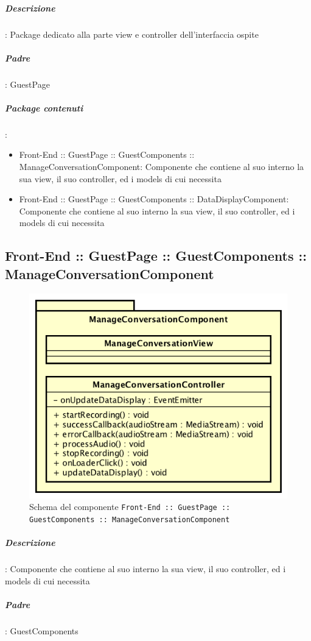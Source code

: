 \documentclass[../ManualeSviluppatore_v2.0.0.tex]{subfiles}
\begin{document}
			\subparagraph{Descrizione}: Package dedicato alla parte view e controller dell'interfaccia ospite
			\subparagraph{Padre}: GuestPage
			\subparagraph{Package contenuti}:
			\begin{itemize}
				\item Front-End :: GuestPage :: GuestComponents :: ManageConversationComponent: Componente che contiene al suo interno la sua view, il suo controller, ed i models di cui necessita
				\item Front-End :: GuestPage :: GuestComponents :: DataDisplayComponent: Componente che contiene al suo interno la sua view, il suo controller, ed i models di cui necessita
			\end{itemize}

	\newpage
	\subsection{Front-End :: GuestPage :: GuestComponents :: ManageConversationComponent}
	\begin{figure}[!h]
		\centering
		\includegraphics[scale=0.7]{Architettura/Front-End/GuestPage/GuestComponents/ManageConversationComponent.png}
		\caption{Schema del componente \texttt{Front-End :: GuestPage :: GuestComponents :: ManageConversationComponent}}
	\end{figure}

			\subparagraph{Descrizione}: Componente che contiene al suo interno la sua view, il suo controller, ed i models di cui necessita
			\subparagraph{Padre}: GuestComponents
			      
\end{document}
